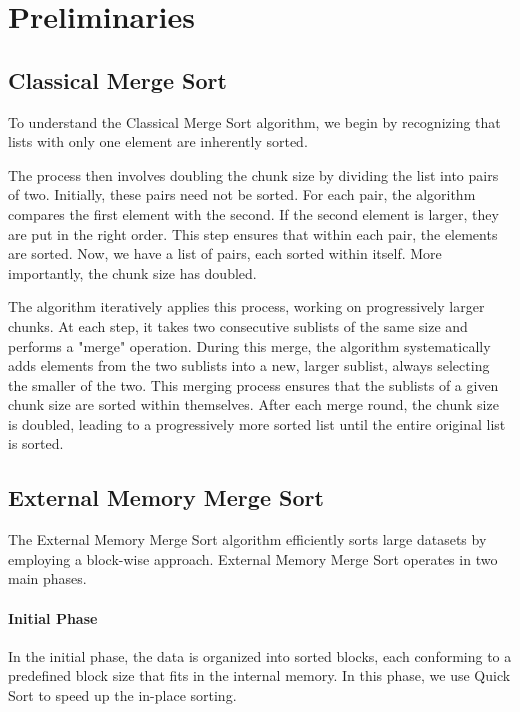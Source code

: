 \documentclass[twocolumn]{article}
\begin{document}
\section{Preliminaries}

\subsection{Classical Merge Sort} \label{sub:classical-explanation}
To understand the Classical Merge Sort algorithm, we begin by recognizing that lists with only one element are inherently sorted.

The process then involves doubling the chunk size by dividing the list into pairs of two.
Initially, these pairs need not be sorted. For each pair, the algorithm compares the first element with the second. If the second element is larger, they are put in the right order.
This step ensures that within each pair, the elements are sorted.
Now, we have a list of pairs, each sorted within itself. More importantly, the chunk size has doubled.

The algorithm iteratively applies this process, working on progressively larger chunks. At each step, it takes two consecutive sublists of the same size and performs a "merge" operation.
During this merge, the algorithm systematically adds elements from the two sublists into a new, larger sublist, always selecting the smaller of the two.
This merging process ensures that the sublists of a given chunk size are sorted within themselves.
After each merge round, the chunk size is doubled, leading to a progressively more sorted list until the entire original list is sorted.

\subsection{External Memory Merge Sort}
The External Memory Merge Sort algorithm efficiently sorts large datasets by employing a block-wise approach.
External Memory Merge Sort operates in two main phases.

\paragraph*{Initial Phase}
In the initial phase, the data is organized into sorted blocks, each conforming to a predefined block size that fits in the internal memory.
In this phase, we use Quick Sort to speed up the in-place sorting.
\end{document}
